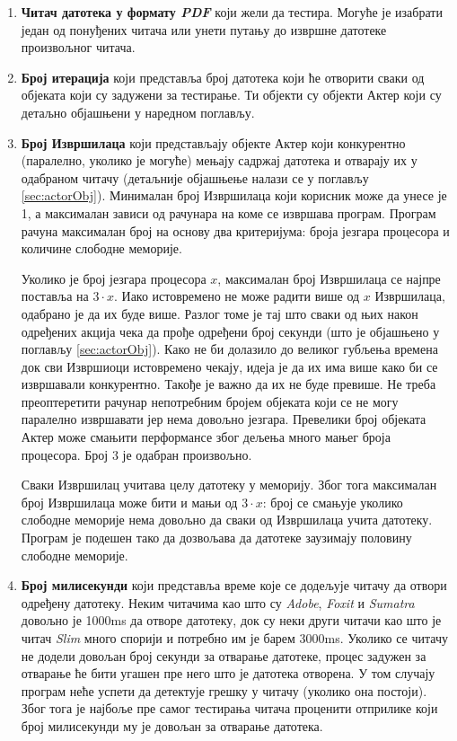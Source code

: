 \documentclass[12pt,oneside]{memoir}
\begin{document}
\begin{enumerate}
\item{\textbf{Читач датотека у формату \textit{PDF}}} који жели да тестира. Могуће је изабрати један од понуђених читача или унети путању до извршне датотеке произвољног читача.
\item{\textbf{Број итерација}} који представља број датотека који ће отворити сваки од објеката који су задужени за тестирање. Ти објекти су објекти Актер који су детаљно објашњени у наредном поглављу. %
\item{\textbf{Број Извршилаца}} који представљају објекте Актер који конкурентно (паралелно, уколико је могуће) мењају садржај датотека и отварају их у одабраном читачу (детаљније објашњење налази се у поглављу \ref{sec:actorObj}). Минималан број Извршилаца који корисник може да унесе је 1, а максималан зависи од рачунара на коме се извршава програм. Програм рачуна максималан број на основу два критеријума: броја језгара процесора и количине слободне меморије.

Уколико је број језгара процесора $x$, максималан број Извршилаца се најпре поставља на $3 \cdot x$. Иако истовремено не може радити више од $x$ Извршилаца, одабрано је да их буде више. Разлог томе је тај што сваки од њих након одређених акција чека да прође одређени број секунди (што је објашњено у поглављу \ref{sec:actorObj}). Како не би долазило до великог губљења времена док сви Извршиоци истовремено чекају, идеја је да их има више како би се извршавали конкурентно. Такође је важно да их не буде превише. Не треба  преоптеретити рачунар непотребним бројем објеката који се не могу паралелно извршавати јер нема довољно језгара. Превелики број објеката Актер може смањити перформансе због дељења много мањег броја процесора. Број $3$ је одабран произвољно.

Сваки Извршилац учитава целу датотеку у меморију. Због тога максималан број Извршилаца може бити и мањи од $3 \cdot x$: број се смањује уколико слободне меморије нема довољно да сваки од Извршилаца учита датотеку. Програм је подешен тако да дозвољава да датотеке заузимају половину слободне меморије.
\item{\textbf{Број милисекунди}} који представља време које се додељује читачу да отвори одређену датотеку. Неким читачима као што су \textit{Adobe}, \textit{Foxit} и \textit{Sumatra} довољно је 1000ms да отворе датотеку, док су неки други читачи као што је читач \textit{Slim} много спорији и потребно им је барем 3000ms. Уколико се читачу не додели довољан број секунди за отварање датотеке, процес задужен за отварање ће бити угашен пре него што је датотека отворена. У том случају програм неће успети да детектује грешку у читачу (уколико она постоји). Због тога је најбоље пре самог тестирања читача проценити отприлике који број милисекунди му је довољан за отварање датотека.
\end{enumerate}
\end{document}
